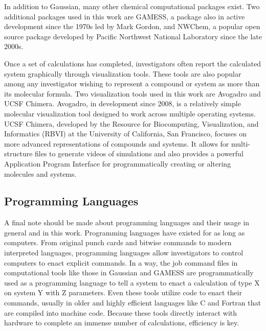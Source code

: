 In addition to Gaussian, many other chemical computational packages exist.
Two additional packages used in this work are GAMESS,\cite{GAMESS} a package also in active development since the 1970s led by Mark Gordon, and NWChem,\cite{NWChem} a popular open source package developed by Pacific Northwest National Laboratory since the late 2000s.

Once a set of calculations has completed, investigators often report the calculated system graphically through visualization tools.
These tools are also popular among any investigator wishing to represent a compound or system as more than its molecular formula.
Two visualization tools used in this work are Avogadro and UCSF Chimera.
Avogadro, in development since 2008, is a relatively simple molecular visualization tool designed to work across multiple operating systems.\cite{Avogadro}
UCSF Chimera, developed by the Resource for Biocomputing, Visualization, and Informatics (RBVI) at the University of California, San Francisco, focuses on more advanced representations of compounds and systems. It allows for multi-structure files to generate videos of simulations and also provides a powerful Application Program Interface for programmatically creating or altering molecules and systems.\cite{UCSFChimera}

\subsection{Programming Languages}

A final note should be made about programming languages and their usage in general and in this work.
Programming languages have existed for as long as computers.
From original punch cards and bitwise commands to modern interpreted languages, programming languages allow investigators to control computers to enact explicit commands.
In a way, the job command files in computational tools like those in Gaussian and GAMESS are programmatically used as a programming language to tell a system to enact a calculation of type X on system Y with Z parameters.
Even these tools utilize code to enact their commands, usually in older and highly efficient languages like C and Fortran that are compiled into machine code.
Because these tools directly interact with hardware to complete an immense number of calculations, efficiency is key.

